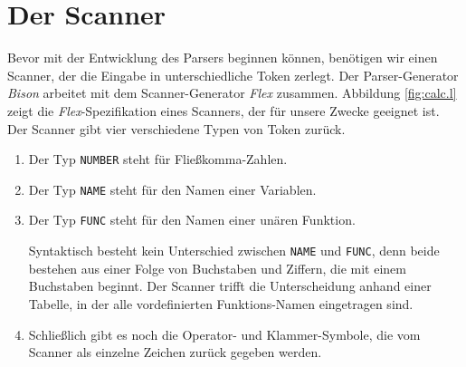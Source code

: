 \section{Der Scanner}
Bevor mit der Entwicklung des Parsers beginnen k\"onnen, ben\"otigen wir einen Scanner, der
die Eingabe in unterschiedliche Token zerlegt.  Der Parser-Generator \textsl{Bison}
arbeitet mit dem Scanner-Generator \textsl{Flex} zusammen.  Abbildung \ref{fig:calc.l}
zeigt die \textsl{Flex}-Spezifikation eines Scanners, der f\"ur unsere Zwecke geeignet ist.
Der Scanner gibt vier verschiedene Typen von Token zur\"uck.
\begin{enumerate}
\item Der Typ \texttt{NUMBER} steht f\"ur Flie{\ss}komma-Zahlen.
\item Der Typ \texttt{NAME} steht f\"ur den Namen einer Variablen.
\item Der Typ \texttt{FUNC} steht f\"ur den Namen einer un\"aren Funktion.

      Syntaktisch besteht kein Unterschied zwischen \texttt{NAME} und \texttt{FUNC},
      denn beide bestehen aus einer Folge von Buchstaben und Ziffern, die mit einem
      Buchstaben beginnt.  Der Scanner trifft die Unterscheidung anhand einer
      Tabelle, in der alle vordefinierten Funktions-Namen eingetragen sind.
\item Schlie{\ss}lich gibt es noch die Operator- und Klammer-Symbole, die vom Scanner als
      einzelne Zeichen zur\"uck gegeben werden.
\end{enumerate}

